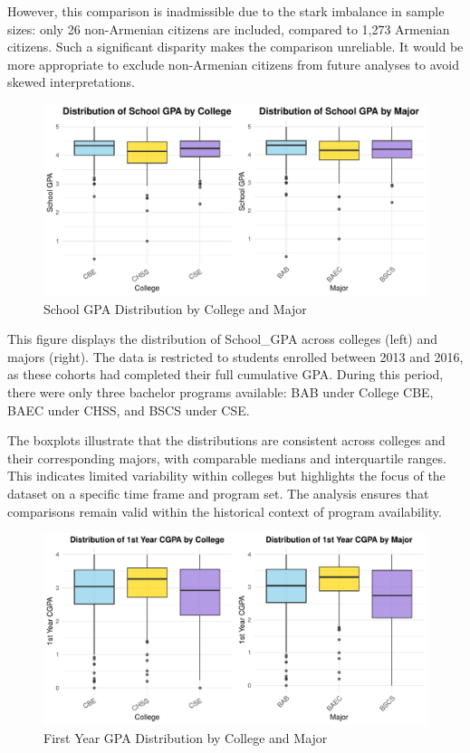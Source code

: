 \documentclass[
  12pt,
]{article}
\begin{document}
However, this comparison is inadmissible due to the stark imbalance in
sample sizes: only 26 non-Armenian citizens are included, compared to
1,273 Armenian citizens. Such a significant disparity makes the
comparison unreliable. It would be more appropriate to exclude
non-Armenian citizens from future analyses to avoid skewed
interpretations.

\newpage

\begin{figure}
\includegraphics[width=0.9\linewidth]{iesm315_report_files/figure-latex/unnamed-chunk-12-1} \caption{School GPA Distribution by College and Major}\label{fig:unnamed-chunk-12}
\end{figure}

This figure displays the distribution of School\_GPA across colleges
(left) and majors (right). The data is restricted to students enrolled
between 2013 and 2016, as these cohorts had completed their full
cumulative GPA. During this period, there were only three bachelor
programs available: BAB under College CBE, BAEC under CHSS, and BSCS
under CSE.

The boxplots illustrate that the distributions are consistent across
colleges and their corresponding majors, with comparable medians and
interquartile ranges. This indicates limited variability within colleges
but highlights the focus of the dataset on a specific time frame and
program set. The analysis ensures that comparisons remain valid within
the historical context of program availability.

\newpage

\begin{figure}
\includegraphics[width=0.9\linewidth]{iesm315_report_files/figure-latex/unnamed-chunk-13-1} \caption{First Year GPA Distribution by College and Major}\label{fig:unnamed-chunk-13}
\end{figure}
\end{document}
